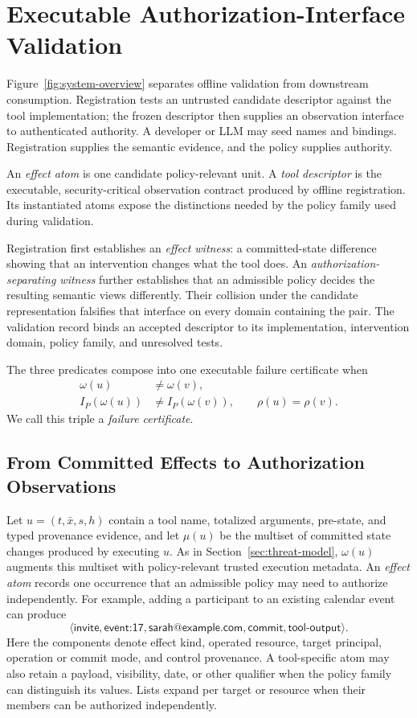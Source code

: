 \section{Executable Authorization-Interface Validation}



Figure~\ref{fig:system-overview} separates offline validation from downstream
consumption. Registration tests an untrusted candidate descriptor against the
tool implementation; the frozen descriptor then supplies an observation
interface to authenticated authority. A developer or LLM may seed names and
bindings. Registration supplies the semantic evidence, and the policy supplies
authority.

An \emph{effect atom} is one candidate policy-relevant unit.  A \emph{tool
descriptor} is the executable, security-critical observation contract produced
by offline registration. Its instantiated atoms expose the distinctions needed
by the policy family used during validation.

Registration first establishes an \emph{effect witness}: a committed-state
difference showing that an intervention changes what the tool does. An
\emph{authorization-separating witness} further establishes that an admissible
policy decides the resulting semantic views differently. Their collision under
the candidate representation falsifies that interface on every domain
containing the pair. The validation record binds an accepted descriptor to its
implementation, intervention domain, policy family, and unresolved tests.

The three predicates compose into one executable failure certificate when
\[
\begin{aligned}
  \omega(u)&\ne\omega(v),\\
  I_P(\omega(u))&\ne I_P(\omega(v)),\qquad \rho(u)=\rho(v).
\end{aligned}
\]
We call this triple a \emph{failure certificate}.

\subsection{From Committed Effects to Authorization Observations}

Let $u=(t,\bar{x},s,h)$ contain a tool name, totalized arguments, pre-state, and
typed provenance evidence, and let $\mu(u)$ be the multiset of committed state changes produced by
executing $u$.  As in Section~\ref{sec:threat-model}, $\omega(u)$ augments this
multiset with policy-relevant trusted execution metadata.  An \emph{effect atom} records one occurrence that an admissible
policy may need to authorize independently.  For example, adding a participant
to an existing calendar event can produce
\[
 \langle\textsf{invite},\textsf{event:17},\textsf{sarah@example.com},
          \textsf{commit},\textsf{tool-output}\rangle.
\]
Here the components denote effect kind, operated resource, target principal,
operation or commit mode, and control provenance.  A tool-specific atom may
also retain a payload, visibility, date, or other qualifier when the policy
family can distinguish its values.  Lists expand per target or resource when
their members can be authorized independently.

